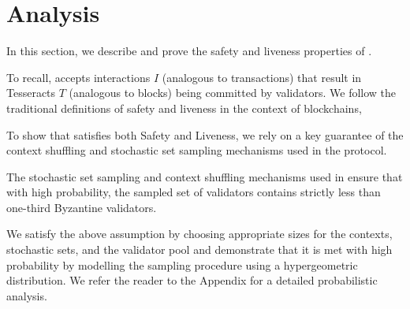 \section{Analysis}
\label{sec:analysis}

In this section, we describe and prove the safety and liveness properties of \codename{}.

To recall, \codename{} accepts interactions $I$ (analogous to transactions) that result in Tesseracts $T$ (analogous to blocks) being committed by validators. We follow the traditional definitions of safety and liveness in the context of blockchains,

To show that \codename{} satisfies both Safety and Liveness, we rely on a key guarantee of the context shuffling and stochastic set sampling mechanisms used in the protocol.

\begin{assumption}
    The stochastic set sampling and context shuffling mechanisms used in \codename{} ensure that with high probability, the sampled set of validators contains strictly less than one-third Byzantine validators.
\end{assumption}

We satisfy the above assumption by choosing appropriate sizes for the contexts, stochastic sets, and the validator pool and demonstrate that it is met with high probability by modelling the sampling procedure using a hypergeometric distribution. We refer the reader to the Appendix for a detailed probabilistic analysis.




